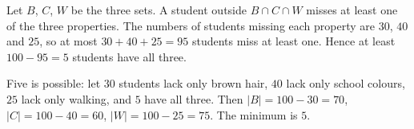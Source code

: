 Let $B$, $C$, $W$ be the three sets. A student outside $B\cap C\cap W$ misses at least one of the three properties. The numbers of students missing each property are $30$, $40$ and $25$, so at most $30+40+25=95$ students miss at least one. Hence at least $100-95=5$ students have all three.

Five is possible: let $30$ students lack only brown hair, $40$ lack only school colours, $25$ lack only walking, and $5$ have all three. Then $|B|=100-30=70$, $|C|=100-40=60$, $|W|=100-25=75$. The minimum is $\boxed{5}$.
